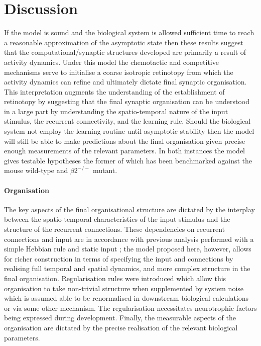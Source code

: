 \section{Discussion}
If the model is sound and the biological system is allowed sufficient time to reach a reasonable approximation of the asymptotic state then these results suggest that the computational/synaptic structures developed are primarily a result of activity dynamics. Under this model the chemotactic and competitive mechanisms serve to initialise a coarse isotropic retinotopy from which the activity dynamics can refine and ultimately dictate final synaptic organisation. This interpretation augments the understanding of the establishment of retinotopy by suggesting that the final synaptic organisation can be understood in a large part by understanding the spatio-temporal nature of the input stimulus, the recurrent connectivity, and the learning rule. Should the biological system not employ the learning routine until asymptotic stability then the model will still be able to make predictions about the final organisation given precise enough measurements of the relevant parameters. In both instances the model gives testable hypotheses the former of which has been benchmarked against the mouse wild-type and $\beta2^{-/-}$ mutant.

\paragraph{Organisation}
The key aspects of the final organisational structure are dictated by the interplay between the spatio-temporal characteristics of the input stimulus and the structure of the recurrent connections. These dependencies on recurrent connections and input are in accordance with previous analysis performed with a simple Hebbian rule and static input \cite{Takeuchi1979-zy}; the model proposed here, however, allows for richer construction in terms of specifying the input and connections by realising full temporal and spatial dynamics, and more complex structure in the final organisation. Regularisation rules were introduced which allow this organisation to take non-trivial structure when supplemented by system noise which is assumed able to be renormalised in downstream biological calculations or via some other mechanism. The regularisation necessitates neurotrophic factors being expressed during development. Finally, the measurable aspects of the organisation are dictated by the precise realisation of the relevant biological parameters.
